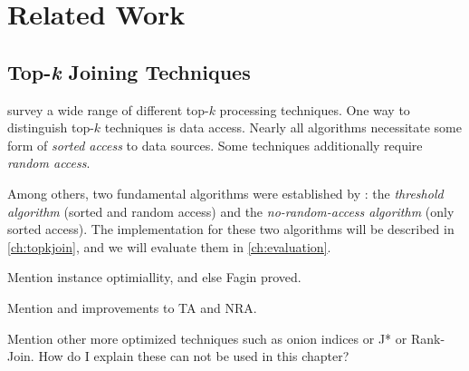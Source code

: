 \chapter{Related Work}
\label{ch:relatedwork}

\section{Top-\emph{k} Joining Techniques}

\textcite{Ilyas2008} survey a wide range of different top-$k$ processing
techniques.
One way to distinguish top-$k$ techniques is data access.
Nearly all algorithms necessitate some form of \emph{sorted access} to data
sources.
Some techniques additionally require \emph{random access}.

Among others, two fundamental algorithms were established by
\textcite{Fagin2001}: the \emph{threshold algorithm} (sorted and random access)
and the \emph{no-random-access algorithm} (only sorted access).
The implementation for these two algorithms will be described in
\cref{ch:topkjoin}, and we will evaluate them in \cref{ch:evaluation}.

\begin{draft}
Mention instance optimiallity, and else Fagin proved.
\end{draft}


\begin{draft}
Mention \textcite{Guentzer2000} and \textcite{Guentzer2001} improvements to TA
and NRA.
\end{draft}

\begin{draft}
Mention other more optimized techniques such as onion indices or J* or
Rank-Join.
How do I explain these can not be used in this chapter?
\end{draft}
